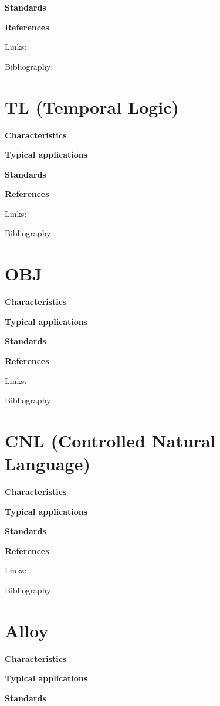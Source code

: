\documentclass{./template/openetcs_report}
\begin{document}
	\textbf{Standards}


	\textbf{References}

Links:



Bibliography:

\section{TL (Temporal Logic)}


	\textbf{Characteristics}


	\textbf{Typical applications}


	\textbf{Standards}


	\textbf{References}

Links:



Bibliography:

\section{OBJ}


	\textbf{Characteristics}


	\textbf{Typical applications}


	\textbf{Standards}


	\textbf{References}

Links:



Bibliography:

\section{CNL (Controlled Natural Language)}


	\textbf{Characteristics}


	\textbf{Typical applications}


	\textbf{Standards}


	\textbf{References}

Links:



Bibliography:

\section{Alloy}


	\textbf{Characteristics}


	\textbf{Typical applications}


	\textbf{Standards}
\end{document}
